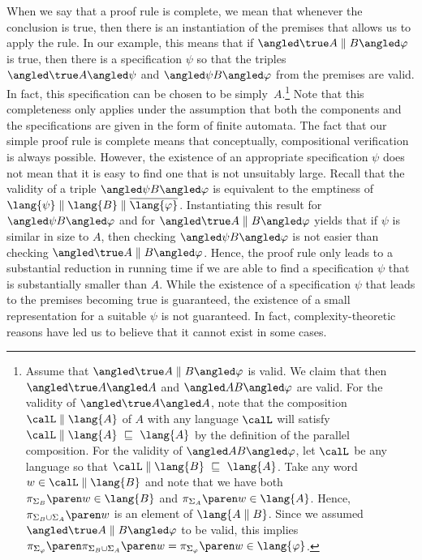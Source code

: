 \documentclass[../../diss.tex]{subfiles}
\begin{document}
When we say that a proof rule is complete, we mean that whenever the conclusion is true, then there is an instantiation of the premises that allows us to apply the rule.
In our example, this means that if $\agtriple{\true}{A \parcomp B}{\varphi}$ is true, then there is a specification $\psi$ so that the triples $\agtriple{\true}{A}{\psi}$ and $\agtriple{\psi}{B}{\varphi}$ from the premises are valid.
In fact, this specification can be chosen to be simply~$A$.\footnote{%
    Assume that $\agtriple{\true}{A \parcomp B}{\varphi}$ is valid.
    We claim that then $\agtriple{\true}{A}{A}$ and $\agtriple{A}{B}{\varphi}$ are valid.
    For the validity of $\agtriple{\true}{A}{A}$, note that the composition $\calL \parcomp \lang{A}$ of $A$ with any language $\calL$ will satisfy $\calL \parcomp \lang{A} \ \sqsubseteq \ \lang{A}$ by the definition of the parallel composition.
    For the validity of $\agtriple{A}{B}{\varphi}$, let $\calL$ be any language so that $\calL \parcomp \lang{B} \ \sqsubseteq \ \lang{A}$.
    Take any word $w \in \calL \parcomp \lang{B}$ and note that we have both $\proj{\Sigma_B}{w} \in \lang{B}$ and $\proj{\Sigma_A}{w} \in \lang{A}$.
    Hence, $\proj{\Sigma_B \cup \Sigma_A}{w}$ is an element of $\lang{A \parcomp B}$.
    Since we assumed $\agtriple{\true}{A \parcomp B}{\varphi}$ to be valid, this implies $\proj{\Sigma_\varphi}{\proj{\Sigma_B \cup \Sigma_A}{w}} = \proj{\Sigma_\varphi}{w} \in \lang{\varphi}$.%
}
Note that this completeness only applies under the assumption that both the components and the specifications are given in the form of finite automata.
The fact that our simple proof rule is complete means that conceptually, compositional verification is always possible.
However, the existence of an appropriate specification $\psi$ does not mean that it is easy to find one that is not unsuitably large.
Recall that the validity of a triple $\agtriple{\psi}{B}{\varphi}$ is equivalent to the emptiness of $\lang{\psi} \parcomp \lang{B} \parcomp \overline{\lang{\varphi}}$.
Instantiating this result for $\agtriple{\psi}{B}{\varphi}$ and for $\agtriple{\true}{A \parcomp B}{\varphi}$ yields that if $\psi$ is similar in size to $A$, then checking $\agtriple{\psi}{B}{\varphi}$ is not easier than checking $\agtriple{\true}{A \parcomp B}{\varphi}$.
Hence, the proof rule only leads to a substantial reduction in running time if we are able to find a specification $\psi$ that is substantially smaller than $A$.
While the existence of a specification $\psi$ that leads to the premises becoming true is guaranteed, the existence of a small representation for a suitable $\psi$ is not guaranteed.
In fact, complexity-theoretic reasons have led us to believe that it cannot exist in some cases.
\end{document}
